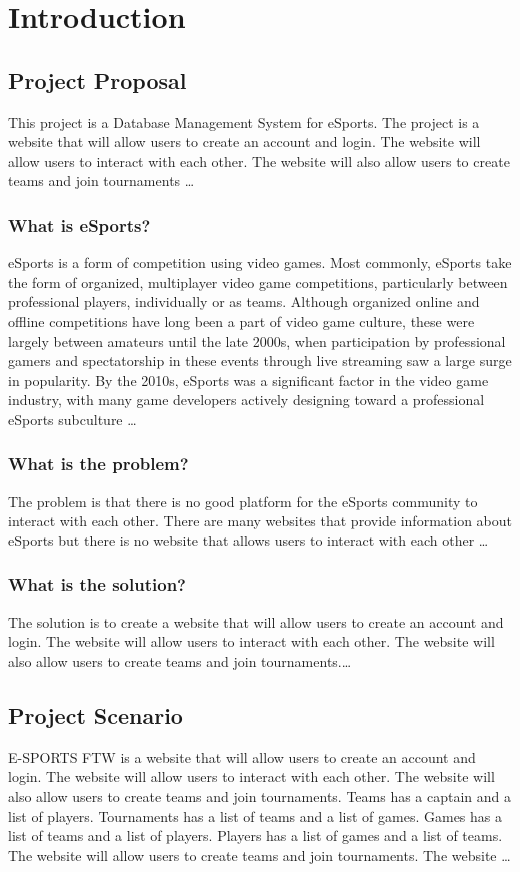 \chapter{Introduction}
\hrulefill

\section{Project Proposal}
This project is a Database Management System for eSports. The project is a website that will allow users to create an account and login. The website will allow users to interact with each other. The website will also allow users to create teams and join tournaments \dots

\subsection{What is eSports?}
eSports is a form of competition using video games. Most commonly, eSports take the form of organized, multiplayer video game competitions, particularly between professional players, individually or as teams. Although organized online and offline competitions have long been a part of video game culture, these were largely between amateurs until the late 2000s, when participation by professional gamers and spectatorship in these events through live streaming saw a large surge in popularity. By the 2010s, eSports was a significant factor in the video game industry, with many game developers actively designing toward a professional eSports subculture \dots

\subsection{What is the problem?}
The problem is that there is no good platform for the eSports community to interact with each other. There are many websites that provide information about eSports but there is no website that allows users to interact with each other \dots

\subsection{What is the solution?}
The solution is to create a website that will allow users to create an account and login. The website will allow users to interact with each other. The website will also allow users to create teams and join tournaments.\dots

\clearpage


\section{Project Scenario}
E-SPORTS FTW is a website that will allow users to create an account and login. The website will allow users to interact with each other. The website will also allow users to create teams and join tournaments. Teams has a captain and a list of players. Tournaments has a list of teams and a list of games. Games has a list of teams and a list of players. Players has a list of games and a list of teams. The website will allow users to create teams and join tournaments. The website \dots